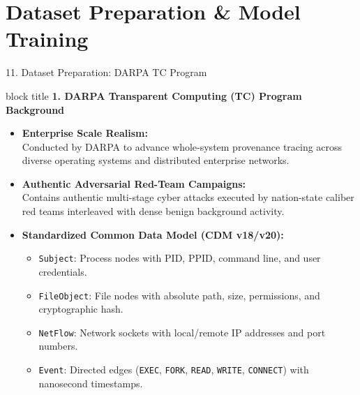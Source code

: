 \documentclass[aspectratio=169,10pt]{beamer}
\begin{document}
\section{Dataset Preparation \& Model Training}

\begin{frame}{11. Dataset Preparation: DARPA TC Program}
\vspace{0.3em}
\begin{beamercolorbox}[rounded=true,shadow=false,sep=0.45em,wd=\textwidth]{block title}
\textbf{\scriptsize 1. DARPA Transparent Computing (TC) Program Background}
\end{beamercolorbox}
\vspace{0.3em}
{\fontsize{8.0pt}{11.5pt}\selectfont
\begin{itemize}\itemsep0.45em
  \item \textbf{Enterprise Scale Realism:}\\
  Conducted by DARPA to advance whole-system provenance tracing across diverse operating systems and distributed enterprise networks.
  \item \textbf{Authentic Adversarial Red-Team Campaigns:}\\
  Contains authentic multi-stage cyber attacks executed by nation-state caliber red teams interleaved with dense benign background activity.
  \item \textbf{Standardized Common Data Model (CDM v18/v20):}
    \begin{itemize}\itemsep0.25em
      \item \texttt{Subject}: Process nodes with PID, PPID, command line, and user credentials.
      \item \texttt{FileObject}: File nodes with absolute path, size, permissions, and cryptographic hash.
      \item \texttt{NetFlow}: Network sockets with local/remote IP addresses and port numbers.
      \item \texttt{Event}: Directed edges (\texttt{EXEC}, \texttt{FORK}, \texttt{READ}, \texttt{WRITE}, \texttt{CONNECT}) with nanosecond timestamps.
    \end{itemize}
\end{itemize}
}
\end{frame}
\end{document}

